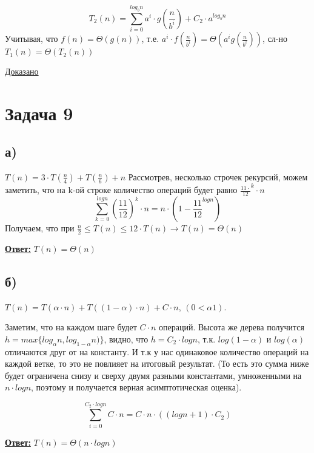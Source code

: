 \documentclass[a4paper,14pt]{article} %
\begin{document}
\begin{equation*}
T_2(n) = \sum_{i = 0}^{log_b n} a^i \cdot g(\frac{n}{b^i}) + C_2 \cdot a^{log_b n}
\end{equation*}
Учитывая, что $f(n) = \Theta(g(n))$, т.е. $a^i \cdot f(\frac{n}{b^i}) = \Theta(a^i g(\frac{n}{b^i}))$,
\newline
сл-но $T_1(n) = \Theta(T_2(n))$

\underline{Доказано}

\section{Задача 9}
\subsection{а)}
$T(n) = 3 \cdot T(\frac{n}{4}) + T(\frac{n}{6}) + n$
Рассмотрев, несколько строчек рекурсий, можем заметить, что на k-ой строке количество операций будет равно $\frac{11 \cdot}{12}^k \cdot n$
\begin{equation*}
	\sum_{k = 0}^{logn} (\frac{11}{12})^k \cdot n = n \cdot (1 - \frac{11}{12}^{logn})
\end{equation*}
Получаем, что при $\frac{n}{2} \leq T(n) \leq 12 \cdot T(n) \longrightarrow T(n) = \Theta(n)$

\underline{\textbf{Ответ:}} $T(n) = \Theta(n)$

\subsection{б)} 
$T(n) = T(\alpha \cdot n) + T((1- \alpha) \cdot n) + C \cdot n$, $(0 < \alpha 1)$.

Заметим, что на каждом шаге будет $C \cdot n$ операций.
Высота же дерева получится $h = max\{log_{\alpha} n, log_{1- \alpha} n)\}$, видно, что $h = C_2 \cdot logn$, т.к. $log(1-\alpha)$ и $log(\alpha)$ отличаются друг от на константу.
И т.к у нас одинаковое количество операций на каждой ветке, то это не повлияет на итоговый результат. (То есть это сумма ниже будет ограничена снизу и сверху двумя разными константами, умноженными на $n \cdot logn$, поэтому и получается верная асимптотическая оценка).

\begin{equation*}
	\sum_{i = 0}^{C_2 \cdot logn} C \cdot n = C \cdot n \cdot((logn + 1) \cdot C_2)
\end{equation*}

\underline{\textbf{Ответ:}} $T(n) = \Theta(n \cdot logn)$
\end{document}
